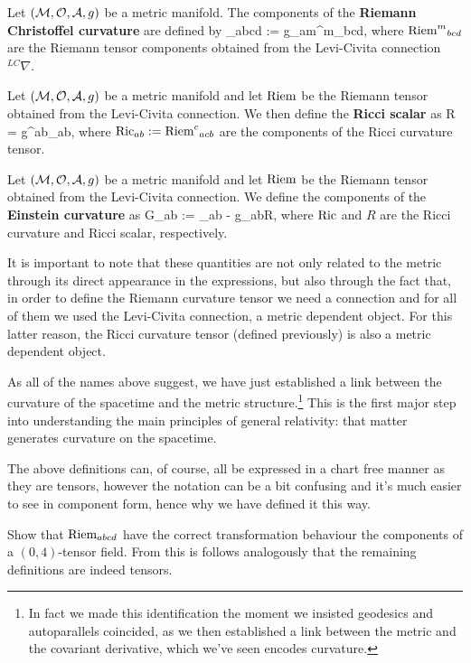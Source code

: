     Let $(\mathcal{M},\mathcal{O},\mathcal{A},g)$ be a metric manifold. The components of the  \textbf{Riemann Christoffel curvature} are defined by  
    \bse 
        \Riem_{abcd} := g_{am}{\Riem^m}_{bcd},
    \ese
    where ${\text{Riem}^m}_{bcd}$ are the Riemann tensor components obtained from the Levi-Civita connection $^{LC}\nabla$. 
\ed 

    Let $(\mathcal{M},\mathcal{O},\mathcal{A},g)$ be a metric manifold and let $\text{Riem}$ be the Riemann tensor obtained from the Levi-Civita connection. We then define the \textbf{Ricci scalar} as 
    \bse 
        R = g^{ab}\Ric_{ab},
    \ese 
    where $\text{Ric}_{ab}:={\text{Riem}^c}_{acb}$ are the components of the Ricci curvature tensor.
\ed 

    Let $(\mathcal{M},\mathcal{O},\mathcal{A},g)$ be a metric manifold and let $\text{Riem}$ be the Riemann tensor obtained from the Levi-Civita connection. We define the components of the \textbf{Einstein curvature} as
    \bse 
        G_{ab} := \Ric_{ab} - g_{ab}R,
    \ese 
    where $\text{Ric}$ and $R$ are the Ricci curvature and Ricci scalar, respectively.
\ed 

It is important to note that these quantities are not only related to the metric through its direct appearance in the expressions, but also through the fact that, in order to define the Riemann curvature tensor we need a connection and for all of them we used the Levi-Civita connection, a metric dependent object. For this latter reason, the Ricci curvature tensor (defined previously) is also a metric dependent object.

As all of the names above suggest, we have just established a link between the curvature of the spacetime and the metric structure.\footnote{In fact we made this identification the moment we insisted geodesics and autoparallels coincided, as we then established a link between the metric and the covariant derivative, which we've seen encodes curvature.} This is the first major step into understanding the main principles of general relativity: that matter generates curvature on the spacetime.

\br 
    The above definitions can, of course, all be expressed in a chart free manner as they are tensors, however the notation can be a bit confusing and it's much easier to see in component form, hence why we have defined it this way. 
\er 

\bbox 
    Show that $\text{Riem}_{abcd}$ have the correct transformation behaviour the components of a $(0,4)$-tensor field. From this is follows analogously that the remaining definitions are indeed tensors.
\ebox 